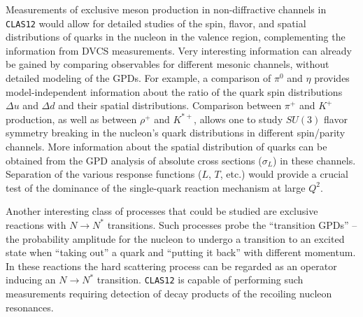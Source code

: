 Measurements of exclusive meson production in non-diffractive channels in
{\tt CLAS12} would allow for detailed studies of the spin, flavor, and 
spatial distributions of quarks in the nucleon in the valence region, 
complementing the information from DVCS measurements.  Very interesting 
information can already be gained by comparing observables for different 
mesonic channels, without detailed modeling of the GPDs.  For example, a 
comparison of $\pi^0$ and $\eta$ provides model-independent information 
about the ratio of the quark spin distributions $\Delta u$ and $\Delta d$ 
and their spatial distributions.  Comparison between $\pi^+$ and $K^+$ 
production, as well as between $\rho^+$ and $K^{*+}$, allows one to study 
$SU(3)$ flavor symmetry breaking in the nucleon's quark distributions in 
different spin/parity channels.  More information about the spatial 
distribution of quarks can be obtained from the GPD analysis of absolute 
cross sections ($\sigma_L$) in these channels.  Separation of the various 
response functions ($L$, $T$, etc.) would provide a crucial test of the 
dominance of the single-quark reaction mechanism at large $Q^2$.

Another interesting class of processes that could be studied are exclusive 
reactions with $N \to N^*$ transitions.  Such processes probe the 
``transition GPDs'' -- the probability amplitude for the nucleon to  
undergo a transition to an excited state when ``taking out'' a quark and 
``putting it back'' with different momentum. In these reactions the hard 
scattering process can be regarded as an operator inducing an $N \to N^*$ 
transition. {\tt CLAS12} is capable of performing such measurements requiring 
detection of decay products of the recoiling nucleon resonances.

